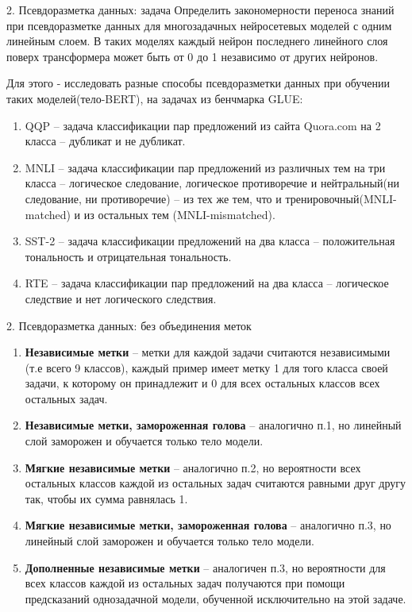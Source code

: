 \begin{frame}{2. Псевдоразметка данных: задача}
Определить закономерности переноса знаний при псевдоразметке данных для многозадачных нейросетевых моделей с одним линейным слоем. В таких моделях каждый нейрон последнего линейного слоя поверх трансформера может быть от 0 до 1 независимо от других нейронов.

    Для этого - исследовать разные способы псевдоразметки данных при обучении таких моделей(тело-BERT), на задачах из бенчмарка GLUE:
    \begin{enumerate}
    \item QQP -- задача классификации пар предложений из сайта Quora.com на 2 класса -- дубликат и не дубликат.
    \item MNLI -- задача классификации пар предложений из различных тем на три класса -- логическое следование, логическое противоречие и нейтральный(ни следование, ни противоречие) -- из тех же тем, что и тренировочный(MNLI-matched) и из остальных тем (MNLI-mismatched).
    \item SST-2 -- задача классификации предложений на два класса -- положительная тональность и отрицательная тональность.
    \item RTE -- задача классификации пар предложений на два класса -- логическое следствие и нет логического следствия.
    \end{enumerate}
\end{frame}


\begin{frame}{2. Псевдоразметка данных: без объединения меток}
    \begin{enumerate}
\item \textbf{Независимые метки} -- метки для каждой задачи считаются независимыми (т.е всего 9 классов), каждый пример имеет метку 1 для того класса своей задачи, к которому он принадлежит и 0 для всех остальных классов всех остальных задач. 
\item \textbf{Независимые метки, замороженная голова} -- аналогично п.1, но линейный слой заморожен и обучается только тело модели.
\item \textbf{Мягкие независимые метки} -- аналогично п.2, но вероятности всех остальных классов каждой из остальных задач считаются равными друг другу так, чтобы их сумма равнялась 1. 
\item \textbf{Мягкие независимые метки, замороженная голова} -- аналогично п.3, но линейный слой заморожен и обучается только тело модели.
\item \textbf{Дополненные независимые метки} -- аналогичен п.3, но вероятности для всех классов каждой из остальных задач получаются при помощи предсказаний однозадачной модели, обученной исключительно на этой задаче.
    \end{enumerate}
\end{frame}


